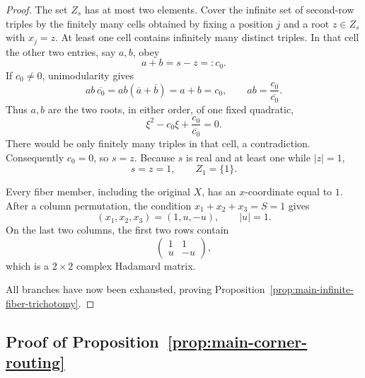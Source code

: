 \documentclass[aps,prx,reprint,nofootinbib,twoside,superscriptaddress,longbibliography,floatfix]{revtex4-2}
\theoremstyle{definition}
\begin{document}
\begin{proof}
The set $Z_s$ has at most two elements.  Cover the infinite set of second-row triples by the finitely many cells obtained by fixing a position $j$ and a root $z\in Z_s$ with $x_j=z$.  At least one cell contains infinitely many distinct triples.  In that cell the other two entries, say $a,b$, obey
\begin{equation}
a+b=s-z=:c_0.
\label{eq:abfixedsum}
\end{equation}
If $c_0\neq0$, unimodularity gives
\begin{equation}
ab\,\overline{c_0}=ab(\overline a+\overline b)=a+b=c_0,
\qquad
ab=\frac{c_0}{\overline{c_0}}.
\label{eq:abproduct}
\end{equation}
Thus $a,b$ are the two roots, in either order, of one fixed quadratic,
\begin{equation}
\xi^2-c_0\xi+\frac{c_0}{\overline{c_0}}=0.
\label{eq:abquadratic}
\end{equation}
There would be only finitely many triples in that cell, a contradiction. Consequently $c_0=0$, so $s=z$.  Because $s$ is real and at least one while $|z|=1$,
\begin{equation}
s=z=1,
\qquad Z_1=\{1\}.
\label{eq:szone}
\end{equation}

Every fiber member, including the original $X$, has an $x$-coordinate equal to $1$.  After a column permutation, the condition $x_1+x_2+x_3=S=1$ gives
\begin{equation}
(x_1,x_2,x_3)=(1,u,-u),
\qquad |u|=1.
\label{eq:oneuminusu}
\end{equation}
On the last two columns, the first two rows contain
\begin{equation}
\begin{pmatrix}1&1\\u&-u\end{pmatrix},
\label{eq:H2block}
\end{equation}
which is a $2\times2$ complex Hadamard matrix.  

{All branches have now been exhausted, proving Proposition~\ref{prop:main-infinite-fiber-trichotomy}.}
\end{proof}

\subsection{{Proof of Proposition~\ref{prop:main-corner-routing}}}
\label{sec:blockswap}
\end{document}
